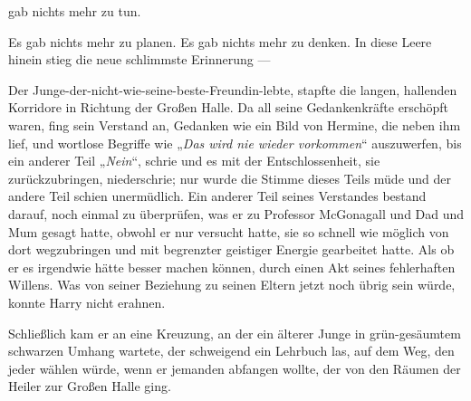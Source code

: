 
 gab nichts mehr zu tun.

\hplettrineextrapara


Es gab nichts mehr zu planen. Es gab nichts mehr zu denken. In diese Leere hinein stieg die neue schlimmste Erinnerung —

Der Junge-der-nicht-wie-seine-beste-Freundin-lebte, stapfte die langen, hallenden Korridore in Richtung der Großen Halle. Da all seine Gedankenkräfte erschöpft waren, fing sein Verstand an, Gedanken wie ein Bild von Hermine, die neben ihm lief, und wortlose Begriffe wie
„\emph{Das wird nie wieder vorkommen}“ auszuwerfen, bis ein anderer Teil
„\emph{Nein}“, schrie und es mit der Entschlossenheit, sie zurückzubringen, niederschrie; nur wurde die Stimme dieses Teils müde und der andere Teil schien unermüdlich. Ein anderer Teil seines Verstandes bestand darauf, noch einmal zu überprüfen, was er zu Professor McGonagall und Dad und Mum gesagt hatte, obwohl er nur versucht hatte, sie so schnell wie möglich von dort wegzubringen und mit begrenzter geistiger Energie gearbeitet hatte. Als ob er es irgendwie hätte besser machen können, durch einen Akt seines fehlerhaften Willens. Was von seiner Beziehung zu seinen Eltern jetzt noch übrig sein würde, konnte Harry nicht erahnen.

Schließlich kam er an eine Kreuzung, an der ein älterer Junge in grün-gesäumtem schwarzen Umhang wartete, der schweigend ein Lehrbuch las, auf dem Weg, den jeder wählen würde, wenn er jemanden abfangen wollte, der von den Räumen der Heiler zur Großen Halle ging.

